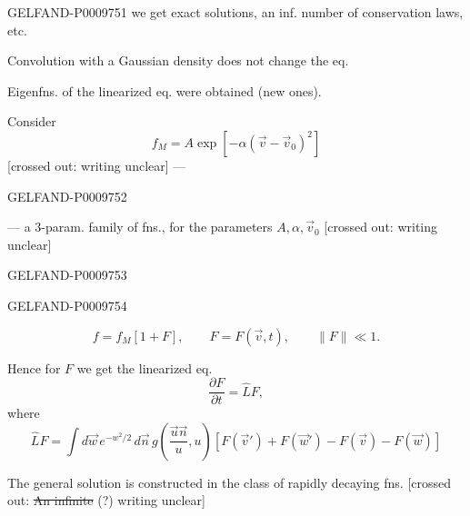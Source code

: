 \begin{GelfandAdjacentEvidence}{GELFAND-P000975}{1}
we get exact solutions, an inf. number of conservation laws, etc.

Convolution with a Gaussian density does not change the eq.

Eigenfns. of the linearized eq. were obtained (new ones).

Consider
\begin{equation*}
 f_M=A\exp[-\alpha(\vec v-\vec v_0)^2]
 \tag{5}
\end{equation*}
[crossed out: writing unclear] --- 
\end{GelfandAdjacentEvidence}
\begin{GelfandAdjacentEvidence}{GELFAND-P000975}{2}


--- a 3-param. family of fns., for the parameters $A,\alpha,\vec v_0$ [crossed out: writing unclear]
\end{GelfandAdjacentEvidence}
\begin{GelfandAdjacentEvidence}{GELFAND-P000975}{3}

\end{GelfandAdjacentEvidence}
\begin{GelfandAdjacentEvidence}{GELFAND-P000975}{4}


\begin{equation*}
 f=f_M[1+F],\qquad F=F(\vec v,t),\qquad \|F\|\ll1.
 \tag{6}
\end{equation*}

Hence for $F$ we get the linearized eq.
\begin{equation*}
 \frac{\partial F}{\partial t}=\widehat L F,
 \tag{7}
\end{equation*}
where
\begin{equation*}
 \widehat L F
 =\int d\vec w\,e^{-w^2/2}\,d\vec n\,
 g\left(\frac{\vec u\vec n}{u},u\right)
 [F(\vec v')+F(\vec w')-F(\vec v)-F(\vec w)]
 \tag{8}
\end{equation*}

The general solution is constructed in the class of rapidly decaying fns. [crossed out: \sout{An infinite} (?) writing unclear]
\end{GelfandAdjacentEvidence}
